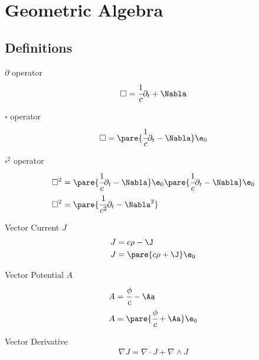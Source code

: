 \section{Geometric Algebra}

\subsection{Definitions}

  \begin{definition}{$\partial$ operator}
    \begin{align}
      \square = \cfrac{1}{c}\partial_t + \Nabla
    \end{align}
  \end{definition}

  \begin{definition}{$\square$ operator}
    \begin{align}
      \square = \pare{\cfrac{1}{c}\partial_t - \Nabla}\e_0
    \end{align}
  \end{definition}

  \begin{definition}{$\square^2$ operator}
    \begin{align}
      \square^2 &= \pare{\cfrac{1}{c}\partial_t - \Nabla}\e_0\pare{\cfrac{1}{c}\partial_t - \Nabla}\e_0 \\
      \square^2 &= \pare{\cfrac{1}{c^2}\partial_t - \Nabla^2}
    \end{align}
  \end{definition}

  \begin{definition}{Vector Current $J$}
    \begin{align}
      J &= c\rho - \J \\
      J &= \pare{c\rho + \J}\e_0
    \end{align}
  \end{definition}

  \begin{definition}{Vector Potential $A$}
    \begin{align}
      A &= \cfrac{\phi}{c} - \Aa \\
      A &= \pare{\cfrac{\phi}{c} + \Aa}\e_0
    \end{align}
  \end{definition}

  \begin{remark}{Vector Derivative}
    \begin{align}
      \nabla J = \nabla \cdot J + \nabla \wedge J
    \end{align}
  \end{remark}

